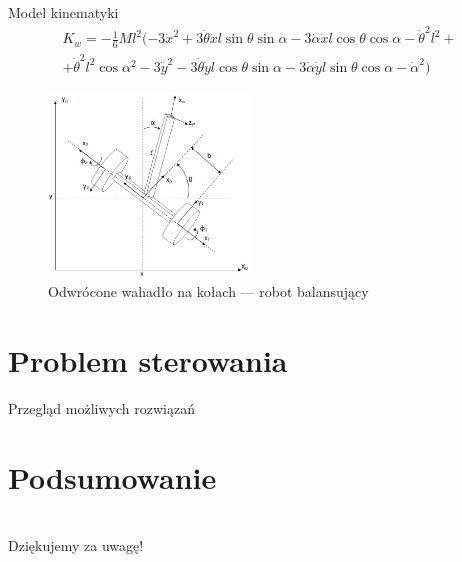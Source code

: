 \begin{frame}{Model kinematyki}
	\begin{align}
	  \nonumber
		K_w = -\frac{1}{6}Ml^2(-3\dot{x}^2 +3\dot{\theta}\dot{x} l \sin{\theta}\sin{\alpha}
		-3\dot{\alpha}\dot{x}l \cos{\theta} \cos{\alpha} - \dot{\theta}^2l^2+\\
	  \nonumber
	    +\dot{\theta}^2 l^2 \cos{\alpha^2} - 3\dot{y}^2 -
	    3 \dot{\theta}\dot{y}l\cos{\theta}\sin{\alpha} - 3 \dot{\alpha}\dot{y}l
	    \sin{\theta}\cos{\alpha}-\dot{\alpha}^2
		)
	\end{align}
	\begin{figure}
		\includegraphics[width=0.48\textwidth]{img/wahadlo}
		\caption{Odwrócone wahadło na kołach --- robot balansujący}
	\end{figure}
\end{frame}

\section{Problem sterowania}
\begin{frame}{Przegląd możliwych rozwiązań}
\end{frame}



\section{Podsumowanie}




\section{}
\begin{frame}
  \begin{center}
    \huge
    Dziękujemy za uwagę!
  \end{center}
 

\end{frame}


